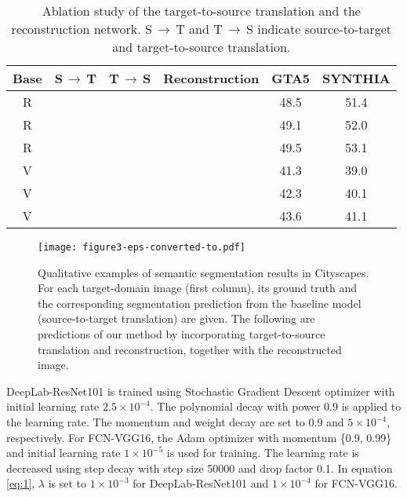 \documentclass[runningheads]{llncs}
\begin{document}
	\newcommand{\cmark}{\ding{51}}\begin{table}[t]
		\caption{Ablation study of the target-to-source translation and the reconstruction network. S$\,\to\,$T and T$\,\to\,$S indicate source-to-target and target-to-source translation. }
		\label{table:ablation_gta2city}
		
		\footnotesize
		\setlength\tabcolsep{5pt}
		\begin{center}
			\begin{tabularx}{.73\textwidth}{ cccc|c|c @{} }
				\toprule
Base & S$\,\to\,$T &  T$\,\to\,$S & Reconstruction & GTA5 & SYNTHIA \\
				\midrule
R & \cmark & & & 48.5 & 51.4 \\
				R & & \cmark & & 49.1 & 52.0 \\
				R & & \cmark & \cmark & 49.5 & 53.1 \\                       
				\midrule
				
V & \cmark & & & 41.3 & 39.0 \\
				V & & \cmark & & 42.3 & 40.1 \\
				V & & \cmark & \cmark & 43.6 & 41.1 \\
				
				\bottomrule
			\end{tabularx}
		\end{center}
\end{table}
	
	\begin{figure*}
\begin{center}
\texttt{[image: figure3-eps-converted-to.pdf]}
		\end{center}
		\caption{Qualitative examples of semantic segmentation results in Cityscapes. For each target-domain image (first column), its ground truth and the corresponding segmentation prediction from the baseline model (source-to-target translation) are given. The following are predictions of our method by incorporating target-to-source translation and reconstruction, together with the reconstructed image.}
		\label{fig:quali_gta2city}
\end{figure*}
	
	DeepLab-ResNet101 is trained using Stochastic Gradient Descent optimizer with initial learning rate $ 2.5\times10^{-4} $. The polynomial decay with power 0.9 is applied to the learning rate. The momentum and weight decay are set to 0.9 and $ 5\times10^{-4} $, respectively. For FCN-VGG16, the Adam optimizer with momentum \{0.9, 0.99\} and initial learning rate $ 1\times10^{-5} $ is used for training. The learning rate is decreased using step decay with step size 50000 and drop factor 0.1. In equation \ref{eq:1}, $ \lambda $ is set to $ 1\times10^{-3} $ for DeepLab-ResNet101 and $ 1\times10^{-4} $ for FCN-VGG16.
	
\end{document}
